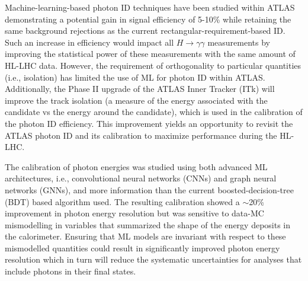 \documentclass[letter, USenglish, 11pt, subfigure]{article}
\begin{document}
Machine-learning-based photon ID techniques have been studied within ATLAS demonstrating a potential gain in signal efficiency of 5-10\%
while retaining the same background rejections as the current rectangular-requirement-based ID. Such an increase in efficiency would impact all $H\to\gamma\gamma$ measurements by improving the statistical power of these measurements with the same amount of HL-LHC data. However, the requirement of orthogonality to particular quantities (i.e., isolation) has limited the use of ML for photon ID within ATLAS. Additionally, the Phase II upgrade of the ATLAS Inner Tracker (ITk) will improve the track isolation (a measure of the energy associated with the candidate vs the energy around the candidate), which is used in the calibration of the photon ID efficiency. This improvement yields an opportunity to revisit the ATLAS photon ID and its calibration to maximize performance during the HL-LHC.


The calibration of photon energies was studied using both advanced ML architectures, i.e., convolutional neural networks (CNNs) and graph neural networks (GNNs), and more information than the current boosted-decision-tree (BDT) based algorithm used. The resulting calibration showed a $\sim$20\% improvement in photon energy resolution but was sensitive to data-MC mismodelling in variables that summarized the shape of the energy deposits in the calorimeter. Ensuring that ML models are invariant with respect to these mismodelled quantities could result in significantly improved photon energy resolution which in turn will reduce the systematic uncertainties for analyses that include photons in their final states.
\end{document}
